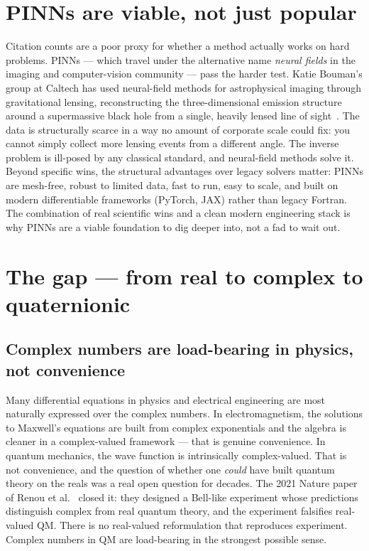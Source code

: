 \documentclass[11pt]{article}
\begin{document}
\section{PINNs are viable, not just popular}

Citation counts are a poor proxy for whether a method actually works on hard problems. PINNs --- which travel under the alternative name \emph{neural fields} in the imaging and computer-vision community --- pass the harder test. Katie Bouman's group at Caltech has used neural-field methods for astrophysical imaging through gravitational lensing, reconstructing the three-dimensional emission structure around a supermassive black hole from a single, heavily lensed line of sight~\cite{Bouman_neural_fields}. The data is structurally scarce in a way no amount of corporate scale could fix: you cannot simply collect more lensing events from a different angle. The inverse problem is ill-posed by any classical standard, and neural-field methods solve it. Beyond specific wins, the structural advantages over legacy solvers matter: PINNs are mesh-free, robust to limited data, fast to run, easy to scale, and built on modern differentiable frameworks (PyTorch, JAX) rather than legacy Fortran. The combination of real scientific wins and a clean modern engineering stack is why PINNs are a viable foundation to dig deeper into, not a fad to wait out.

\section{The gap --- from real to complex to quaternionic}

\subsection{Complex numbers are load-bearing in physics, not convenience}

Many differential equations in physics and electrical engineering are most naturally expressed over the complex numbers. In electromagnetism, the solutions to Maxwell's equations are built from complex exponentials and the algebra is cleaner in a complex-valued framework --- that is genuine convenience. In quantum mechanics, the wave function is intrinsically complex-valued. That is not convenience, and the question of whether one \emph{could} have built quantum theory on the reals was a real open question for decades. The 2021 Nature paper of Renou et al.~\cite{Renou2021Nature} closed it: they designed a Bell-like experiment whose predictions distinguish complex from real quantum theory, and the experiment falsifies real-valued QM. There is no real-valued reformulation that reproduces experiment. Complex numbers in QM are load-bearing in the strongest possible sense.
\end{document}
